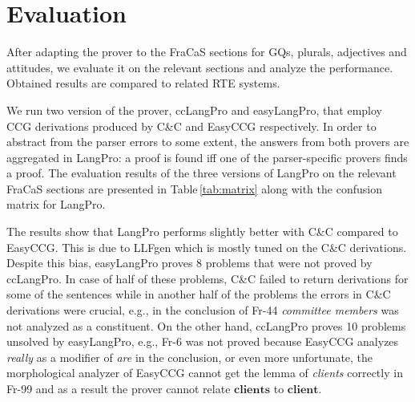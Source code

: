 \documentclass[11pt]{article}
\newcommand{\candc}{C\&C}
\newcommand{\easyccg}{EasyCCG}
\newcommand{\llfgen}{LLFgen}
\newcommand{\synt}[1]{\textbf{#1}}
\begin{document}
\section{Evaluation}
\label{sec:eval}

After adapting the prover to the FraCaS sections for GQs, plurals, adjectives and attitudes, we evaluate it on the relevant sections and analyze the performance. Obtained results are compared to related RTE systems. 


We run two version of the prover, ccLangPro and easyLangPro, that employ CCG derivations produced by \candc{} and \easyccg{} respectively.
In order to abstract from the parser errors to some extent, the answers from both provers are aggregated in LangPro: a proof is found iff one of the parser-specific provers finds a proof.
The evaluation results of the three versions of LangPro on the relevant FraCaS sections are presented in Table\,\ref{tab:matrix} along with the confusion matrix for LangPro.





The results show that LangPro performs slightly better with \candc{} compared to \easyccg{}. 
This is due to \llfgen{} which is mostly tuned on the \candc{} derivations.
Despite this bias, easyLangPro proves 8 problems that were not proved by ccLangPro.
In case of half of these problems, \candc{} failed to return derivations for some of the sentences while in another half of the problems the errors in \candc{} derivations were crucial, e.g., in the conclusion of Fr-44 {\em committee members} was not analyzed as a constituent. 
On the other hand, ccLangPro proves 10 problems unsolved by easyLangPro, e.g., Fr-6 was not proved because \easyccg{} analyzes {\em really} as a modifier of {\em are} in the conclusion, or even more unfortunate, the morphological analyzer of \easyccg{} cannot get the lemma of {\em clients} correctly in Fr-99 and as a result the prover cannot relate $\synt{clients}$ to $\synt{client}$. 
\end{document}
